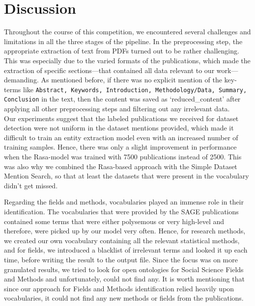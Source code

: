 \documentclass[runningheads]{llncs}
\begin{document}
\section{Discussion}
Throughout the course of this competition, we encountered several challenges and limitations in all the three stages of the pipeline. In the preprocessing step, the appropriate extraction of text from PDFs turned out to be rather challenging. This was especially due to the varied formats of the publications, which made the extraction of specific sections---that contained all data relevant to our work---demanding. As mentioned before, if there was no explicit mention of the key-terms like \texttt{Abstract, Keywords, Introduction, Methodology/Data, Summary, Conclusion} in the text, then the content was saved as `reduced\_content' after applying all other preprocessing steps and filtering out any irrelevant data. \\

Our experiments suggest that the labeled publications we received for dataset detection were not uniform in the dataset mentions provided, which made it difficult to train an entity extraction model even with an increased number of training samples. Hence, there was only a slight improvement in performance when the Rasa-model was trained with 7500 publications instead of 2500. This was also why we combined the Rasa-based approach with the Simple Dataset Mention Search, so that at least the datasets that were present in the vocabulary didn't get missed. 

Regarding the fields and methods, vocabularies played an immense role in %
their identification. The vocabularies that were provided by the SAGE publications contained some terms that were either polysemous or very high-level and therefore, were picked up by our model very often. Hence, for research methods, we created our own vocabulary containing all the relevant statistical methods, and for fields, we introduced a blacklist of irrelevant terms and looked it up each time, before writing the result to the output file. Since the focus was on more granulated results, we tried to look for open ontologies for Social Science Fields and Methods and unfortunately, could not find any. It is worth mentioning that since our approach for Fields and Methods identification relied heavily upon vocabularies, it could not find any new methods or fields from the publications. 
\end{document}
